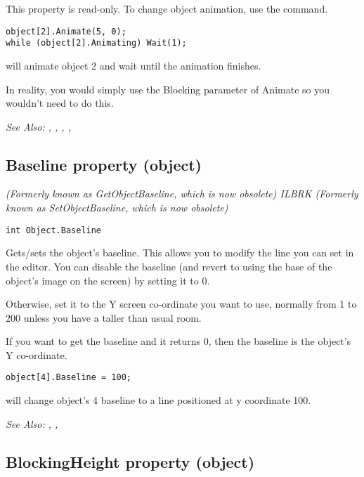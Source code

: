 This property is read-only. To change object animation, use the
 command.

\begin{verbatim}
object[2].Animate(5, 0);
while (object[2].Animating) Wait(1);
\end{verbatim}
will animate object 2 and wait until the animation finishes.

In reality, you would simply use the Blocking parameter of Animate so you wouldn't need
to do this.

\it{See Also:} ,
,
,
, 


\subsection{Baseline property (object)}\label{Object.Baseline}%

\it{(Formerly known as GetObjectBaseline, which is now obsolete)} ILBRK
\it{(Formerly known as SetObjectBaseline, which is now obsolete)}

\begin{verbatim}
int Object.Baseline
\end{verbatim}
Gets/sets the object's baseline. This allows you to modify the line you can
set in the editor. You can disable the baseline (and revert to using the
base of the object's image on the screen) by setting it to 0.

Otherwise, set it to the Y screen co-ordinate you want to use,
normally from 1 to 200 unless you have a taller than usual room.

If you want to get the baseline and it returns 0, then the baseline is the
object's Y co-ordinate.

\begin{verbatim}
object[4].Baseline = 100;
\end{verbatim}
will change object's 4 baseline to a line positioned at y coordinate 100.

\it{See Also:} ,
,


\subsection{BlockingHeight property (object)}\label{Object.BlockingHeight}%

